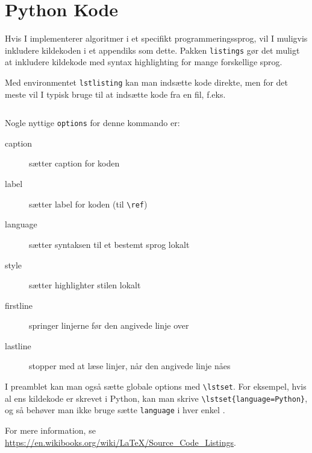 
\chapter{Python Kode}
\label{app:code}

Hvis I implementerer algoritmer i et specifikt programmeringssprog, vil I muligvis inkludere kildekoden i et appendiks som dette.
Pakken \texttt{listings} gør det muligt at inkludere kildekode med syntax highlighting for mange forskellige sprog.

Med environmentet \texttt{lstlisting} kan man indsætte kode direkte, men for det meste vil I typisk bruge \verb!! til at indsætte kode fra en fil, f.eks.
%
\begin{verbatim}

\end{verbatim}
%
Nogle nyttige \texttt{options} for denne kommando er:
%
\begin{description}
\item[caption] sætter caption for koden
\item[label] sætter label for koden (til \verb!\ref!)
\item[language] sætter syntaksen til et bestemt sprog lokalt
\item[style] sætter highlighter stilen lokalt
\item[firstline] springer linjerne før den angivede linje over
\item[lastline] stopper med at læse linjer, når den angivede linje nåes
\end{description}
%
I preamblet kan man også sætte globale options med \verb!\lstset!.
For eksempel, hvis al ens kildekode er skrevet i Python, kan man skrive \verb!\lstset{language=Python}!, og så behøver man ikke bruge sætte \texttt{language} i hver enkel \verb!!.



For mere information, se \url{https://en.wikibooks.org/wiki/LaTeX/Source_Code_Listings}.
